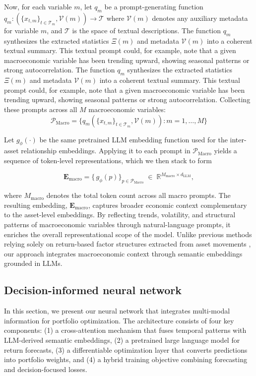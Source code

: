 Now, for each variable $m$, let $q_{m}$ be a prompt-generating function $q_{m}: \left(\{x_{t,m}\}_{t \in \mathcal{T}_{m}},\mathcal{V}(m)\right) \to \mathcal{T}$ where $\mathcal{V}(m)$ denotes any auxiliary metadata for variable $m$, and $\mathcal{T}$ is the space of textual descriptions. The function $q_{m}$ synthesizes the extracted statistics $\Xi(m)$ and metadata $\mathcal{V}(m)$ into a coherent textual summary. This textual prompt could, for example, note that a given macroeconomic variable has been trending upward, showing seasonal patterns or strong autocorrelation. The function $q_{m}$ synthesizes the extracted statistics $\Xi(m)$ and metadata $\mathcal{V}(m)$ into a coherent textual summary. This textual prompt could, for example, note that a given macroeconomic variable has been trending upward, showing seasonal patterns or strong autocorrelation. Collecting these prompts across all $M$ macroeconomic variables:
\begin{equation} 
    \mathcal{P}_{\text{Macro}} = \{q_{m}(\{x_{t,m}\}_{t\in \mathcal{T}_{m}}, \mathcal{V}(m)) : m=1,\ldots,M \}
\end{equation}

Let $g_{\phi}(\cdot)$ be the same pretrained LLM embedding function used for the inter-asset relationship embeddings. Applying it to each prompt in $\mathcal{P}_{\text{Macro}}$ yields a sequence of token-level representations, which we then stack to form

\begin{equation}
    \mathbf{E}_{\text{macro}} 
    = \bigl\{\,g_{\phi}(p)\bigr\}_{p \in \mathcal{P}_{\text{Macro}}}
    \;\in\;\mathbb{R}^{M_{\text{macro}} \times d_{\text{LLM}}},    
\end{equation}

where $M_{\text{macro}}$ denotes the total token count across all macro prompts. The resulting embedding, $\mathbf{E}_{\text{macro}}$, captures broader economic context complementary to the asset-level embeddings. By reflecting trends, volatility, and structural patterns of macroeconomic variables through natural-language prompts, it enriches the overall representational scope of the model. Unlike previous methods relying solely on return-based factor structures extracted from asset movements \citep{zhang2021universal, giglio2022factor, chen2024deep}, our approach integrates macroeconomic context through semantic embeddings grounded in LLMs.

\subsection{Decision-informed neural network} In this section, we present our neural network that integrates multi-modal information for portfolio optimization. The architecture consists of four key components: (1) a cross-attention mechanism that fuses temporal patterns with LLM-derived semantic embeddings, (2) a pretrained large language model for return forecasts, (3) a differentiable optimization layer that converts predictions into portfolio weights, and (4) a hybrid training objective combining forecasting and decision-focused losses. 

